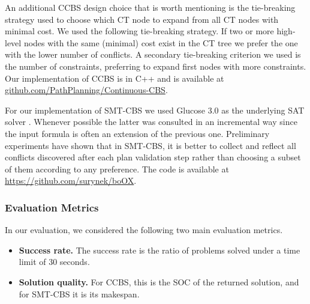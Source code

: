 \documentclass[review]{elsarticle}
\newcommand\konstantin[1]{\nb{\textbf{Konstantin:}}{red}{#1}}
\newcommand\roni[1]{\nb{\textbf{Roni:}}{green}{#1}}
\newcommand\pavel[1]{\nb{\textbf{Pavel:}}{blue}{#1}}
\newcommand{\ccbs}{\ac{CCBS}\xspace}
\newcommand{\ct}{\ac{CT}\xspace}
\newcommand{\smtcbs}{SMT-CBS\xspace}
\newcommand{\iscollision}{\textsc{IsCollision}\xspace}
\newcommand{\inconflict}{\textsc{InConflict}\xspace}
\begin{document}

An additional \ccbs design choice that is worth mentioning is the tie-breaking strategy used to choose which \ct node to expand from all \ct nodes with minimal cost. We used the following tie-breaking strategy. If two or more high-level nodes with the same (minimal) cost exist in the CT tree we prefer the one with the lower number of conflicts. A secondary tie-breaking criterion we used is the number of constraints, preferring to expand first nodes with more constraints. %
Our implementation of \ccbs is in C++ and is available at \url{github.com/PathPlanning/Continuous-CBS}.


For our implementation of \smtcbs we used  Glucose 3.0 as the underlying SAT solver \cite{DBLP:journals/ijait/AudemardS18}.  Whenever possible the latter was consulted in an incremental way since the input formula is often an extension of the previous one. Preliminary experiments have shown that in \smtcbs, it is better to collect and reflect all conflicts discovered after each plan validation step rather than choosing a subset of them according to any preference. The code is available at \url{https://github.com/surynek/boOX}.


\subsubsection{Evaluation Metrics}
In our evaluation, we considered the following two main evaluation metrics. 
\begin{itemize}
    \item \textbf{Success rate.} The success rate is the ratio of problems solved under a time limit of 30 seconds. 
    \item \textbf{Solution quality.} For \ccbs, this is the SOC of the returned solution, and for \smtcbs it is its makespan.
\end{itemize}
\end{document}
